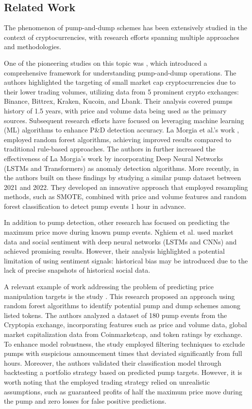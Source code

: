 \documentclass{ieeeaccess}
\begin{document}
\subsection{Related Work}

The phenomenon of pump-and-dump schemes has been extensively studied in the context of cryptocurrencies, with research efforts spanning multiple approaches and methodologies.

One of the pioneering studies on this topic was \cite{kamps_moon_2018}, which introduced a comprehensive framework for understanding pump-and-dump operations. The authors highlighted the targeting of small market cap cryptocurrencies due to their lower trading volumes, utilizing data from 5 prominent crypto exchanges: Binance, Bittrex, Kraken, Kucoin, and Lbank. Their analysis covered pumps history of 1.5 years, with price and volume data being used as the primary sources. Subsequent research efforts have focused on leveraging machine learning (ML) algorithms to enhance P\&D detection accuracy. La Morgia et al.'s work \cite{la_morgia_pump_2020}, \cite{la2023doge} employed random forest algorithms, achieving improved results compared to traditional rule-based approaches. The authors in \cite{chadalapaka_crypto_2022} further increased the effectiveness of La Morgia's work by incorporating Deep Neural Networks (LSTMs and Transformers) as anomaly detection algorithms.
More recently, in \cite{econometrics11030022} the authors built on these findings by studying a similar pump dataset between 2021 and 2022. They developed an innovative approach that employed resampling methods, such as SMOTE, combined with price and volume features and random forest classification to detect pump events 1 hour in advance.

In addition to pump detection, other research has focused on predicting the maximum price move during known pump events. Nghiem et al. \cite{nghiem_2021} used market data and social sentiment with deep neural networks (LSTMs and CNNs) and achieved promising results. However, their analysis highlighted a potential limitation of using sentiment signals: historical bias may be introduced due to the lack of precise snapshots of historical social data.

A relevant example of work addressing the problem of predicting price manipulation targets is the study \cite{pd_anatomy}. This research proposed an approach using random forest algorithms to identify potential pump and dump schemes among listed tokens. The authors analyzed a dataset of 180 pump events from the Cryptopia exchange, incorporating features such as price and volume data, global market capitalization data from Coinmarketcap, and token ratings by exchange. To enhance model robustness, the study employed filtering techniques to exclude pumps with suspicious announcement times that deviated significantly from full hours. Moreover, the authors validated their classification model through backtesting a portfolio strategy based on predicted pump targets. However, it is worth noting that the employed trading strategy relied on unrealistic assumptions, such as guaranteed profits of half the maximum price move during the pump and zero losses for false positive predictions.
\end{document}
